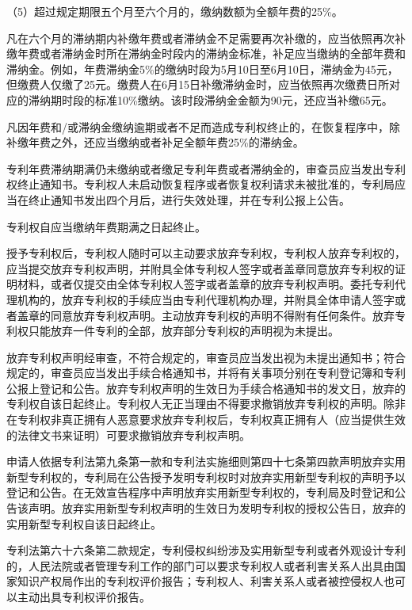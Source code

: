 {\setlength{\parindent}{17.1bp}（5）超过规定期限五个月至六个月的，缴纳数额为全额年费的25\%。\par}

凡在六个月的滞纳期内补缴年费或者滞纳金不足需要再次补缴的，应当依照再次补缴年费或者滞纳金时所在滞纳金时段内的滞纳金标准，补足应当缴纳的全部年费和滞纳金。例如，年费滞纳金5\%的缴纳时段为5月10日至6月10日，滞纳金为45元，但缴费人仅缴了25元。缴费人在6月15日补缴滞纳金时，应当依照再次缴费日所对应的滞纳期时段的标准10\%缴纳。该时段滞纳金金额为90元，还应当补缴65元。

凡因年费和/或滞纳金缴纳逾期或者不足而造成专利权终止的，在恢复程序中，除补缴年费之外，还应当缴纳或者补足全额年费25\%的滞纳金。

专利年费滞纳期满仍未缴纳或者缴足专利年费或者滞纳金的，审查员应当发出专利权终止通知书。专利权人未启动恢复程序或者恢复权利请求未被批准的，专利局应当在终止通知书发出四个月后，进行失效处理，并在专利公报上公告。

专利权自应当缴纳年费期满之日起终止。

授予专利权后，专利权人随时可以主动要求放弃专利权，专利权人放弃专利权的，应当提交放弃专利权声明，并附具全体专利权人签字或者盖章同意放弃专利权的证明材料，或者仅提交由全体专利权人签字或者盖章的放弃专利权声明。委托专利代理机构的，放弃专利权的手续应当由专利代理机构办理，并附具全体申请人签字或者盖章的同意放弃专利权声明。主动放弃专利权的声明不得附有任何条件。放弃专利权只能放弃一件专利的全部，放弃部分专利权的声明视为未提出。

放弃专利权声明经审查，不符合规定的，审查员应当发出视为未提出通知书；符合规定的，审查员应当发出手续合格通知书，并将有关事项分别在专利登记簿和专利公报上登记和公告。放弃专利权声明的生效日为手续合格通知书的发文日，放弃的专利权自该日起终止。专利权人无正当理由不得要求撤销放弃专利权的声明。除非在专利权非真正拥有人恶意要求放弃专利权后，专利权真正拥有人（应当提供生效的法律文书来证明）可要求撤销放弃专利权声明。

申请人依据专利法第九条第一款和专利法实施细则第四十七条第四款声明放弃实用新型专利权的，专利局在公告授予发明专利权时对放弃实用新型专利权的声明予以登记和公告。在无效宣告程序中声明放弃实用新型专利权的，专利局及时登记和公告该声明。放弃实用新型专利权声明的生效日为发明专利权的授权公告日，放弃的实用新型专利权自该日起终止。

专利法第六十六条第二款规定，专利侵权纠纷涉及实用新型专利或者外观设计专利的，人民法院或者管理专利工作的部门可以要求专利权人或者利害关系人出具由国家知识产权局作出的专利权评价报告；专利权人、利害关系人或者被控侵权人也可以主动出具专利权评价报告。

